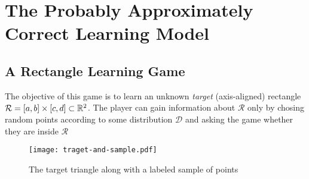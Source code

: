 \chapter{The Probably Approximately Correct Learning Model}
    \section{A Rectangle Learning Game}
    \newcommand{\rectangle}{\mathcal{R}}
    The objective of this game is to learn an unknown \emph{target} (axis-aligned) rectangle \(\rectangle = [a, b] \times [c, d] \subset \reals^2\).
    The player can gain information about \(\rectangle\) only by chosing random points according to some distribution \(\mathcal{D}\) and asking the game whether they are inside \(\rectangle\)

    \begin{figure}
        \begin{center}
                \texttt{[image: traget-and-sample.pdf]}
        \end{center}
        \caption{The target triangle along with a labeled sample of points}
    \end{figure}
